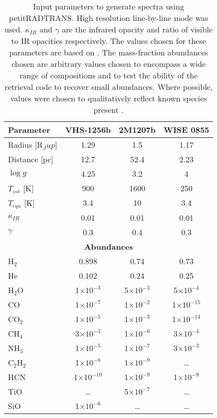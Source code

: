 \begin{table}[t]
	\centering
	\begin{tabular}{l|ccc}
		\toprule
		\textbf{Parameter} & \textbf{VHS-1256b} & \textbf{2M1207b} & \textbf{WISE 0855}\\
		\midrule
		Radius [R$_Jup$] & 1.29 & 1.5 & 1.17\\
		Distance [pc] & 12.7 & 52.4 & 2.23\\
		$\log g$ & 4.25 & 3.2 & 4\\
		$T_{int}$ [K]& 900 & 1600 & 250\\
		$T_{equ}$ [K]& 3.4 & 10 & 3.4\\
		$\kappa_{IR}$ & 0.01 & 0.01 & 0.01\\
		$\gamma$ & 0.3 & 0.4 & 0.3\\
		\midrule
		\multicolumn{4}{c}{\textbf{Abundances}}\\
		\midrule
		H$_{2}$ & 0.898 & 0.74 & 0.73\\
		He & 0.102 & 0.24 & 0.25\\
		H$_{2}$O & 1$\times10^{-3}$ & 5$\times10^{-3}$ & 5$\times10^{-4}$\\
		CO & 1$\times10^{-7}$& 1$\times10^{-2}$ & 1$\times10^{-15}$\\
		CO$_{2}$ & 1$\times10^{-5}$& 1$\times10^{-3}$ & 1$\times10^{-14}$\\
		CH$_{4}$ & 3$\times10^{-3}$& 1$\times10^{-6}$ & 3$\times10^{-4}$\\
		NH$_{3}$ & 1$\times10^{-5}$& 1$\times10^{-7}$ & 3$\times10^{-3}$\\
		C$_{2}$H$_{2}$ & 1$\times10^{-8}$& 1$\times10^{-9}$& \ldots \\
		HCN & 1$\times10^{-10}$ & 1$\times10^{-9}$ & 1$\times10^{-9}$ \\
		TiO & \ldots & 5$\times10^{-7}$ & \ldots \\
		SiO & 1$\times10^{-6}$ &  \ldots & \ldots \\
		\bottomrule
	\end{tabular}
	\caption[petitRADTRANS inputs.]{Input parameters to generate spectra using petitRADTRANS. High resolution line-by-line mode was used. $\kappa_{IR}$ and $\gamma$ are the infrared opacity and ratio of visible to IR opacities respectively. The values chosen for these parameters are based on \parencite{Molliere2019}. The mass-fraction abundances chosen are arbitrary values chosen to encompass a wide range of compositions and to test the ability of the retrieval code to recover small abundances. Where possible, values were chosen to qualitatively reflect known species present \parencite{Miles2018}. }
	\label{tab:inputparams}
\end{table}

